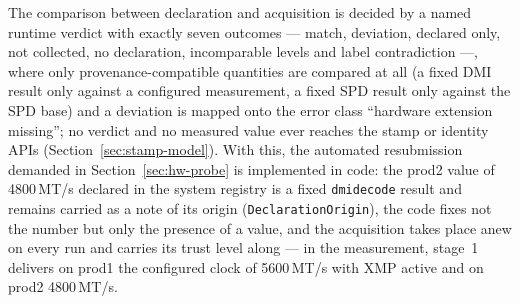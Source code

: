 \begin{nurlang}
The comparison between declaration and acquisition is decided by a named runtime verdict with exactly
seven outcomes --- match, deviation, declared only, not collected, no declaration, incomparable levels
and label contradiction ---, where only provenance-compatible quantities are compared at all (a fixed
DMI result only against a configured measurement, a fixed SPD result only against the SPD base) and a
deviation is mapped onto the error class \enquote{hardware extension missing}; no verdict and no
measured value ever reaches the stamp or identity APIs (Section~\ref{sec:stamp-model}). With this,
the automated resubmission demanded in Section~\ref{sec:hw-probe} is implemented in code: the prod2
value of 4800\,MT/s declared in the system registry is a fixed \texttt{dmidecode} result and remains
carried as a note of its origin (\texttt{DeclarationOrigin}), the code fixes not the number but only
the presence of a value, and the acquisition takes place anew on every run and carries its trust level
along --- in the measurement, stage~1 delivers on prod1 the configured clock of 5600\,MT/s with XMP
active and on prod2 4800\,MT/s.
\end{nurlang}

